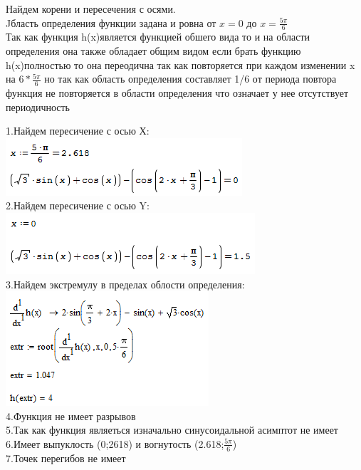 \documentclass[russian,utf8,nocolumnxxxi,nocolumnxxxii]{eskdtext}
\begin{document}
{
\newpage
Найдем корени и пересечения с осями.
\\Jбласть определения функции задана и ровна от $x=0$ до $x=\frac{5\pi}{6}$
\\Так как функция h(x)является функцией обшего вида то и на области определения она также обладает общим видом если брать функцию h(x)полностью то она переодична так как повторяется при каждом изменении x на $6*\frac {5\pi}{6}$ но так как область определения составляет 1/6 от периода повтора функция не повторяется в области определения что означает у нее отсутствует периодичность
\par
\normalsize
1.Найдем пересичение с осью Х:
\\\includegraphics[scale=0.90]{2019-01-11_02-56-05}
\\2.Найдем пересичение с осью Y:
\\\includegraphics[scale=0.90]{2019-01-11_02-56-50}
\\3.Найдем экстремулу в пределах облости определения:
\\\includegraphics[scale=1]{2019-01-11_03-18-55}
\\4.Функция не имеет разрывов 
\\5.Так как функция являеться изначально синусоидальной асимптот не имеет
\\6.Имеет выпуклость (0;2618) и вогнутость (2.618;$\frac{5\pi}{6}$)
\\7.Точек перегибов не имеет

}
\end{document}
